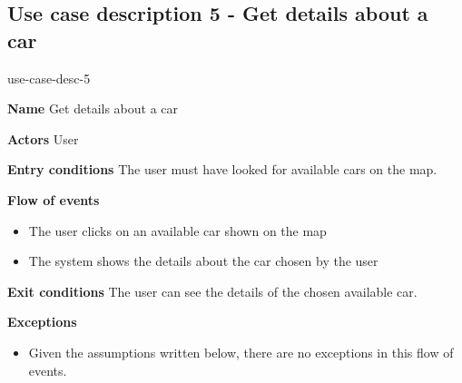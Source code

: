 \subsection{Use case description 5 - Get details about a car}
\begin{labeling}{use-case-desc-5}
		\item[\textbf{Name}] Get details about a car
		\item[\textbf{Actors}] User
		\item[\textbf{Entry conditions}] The user must have looked for available cars on the map.
		\item[\textbf{Flow of events}]
			\begin{itemize}
				\item[]
				\item The user clicks on an available car shown on the map
				\item The system shows the details about the car chosen by the user
			\end{itemize}
		\item[\textbf{Exit conditions}] The user can see the details of the chosen available car.
		\item[\textbf{Exceptions}]
			\begin{itemize}
				\item[]
				\item Given the assumptions written below, there are no exceptions in this flow of events.
			\end{itemize}
	\end{labeling}	
	
